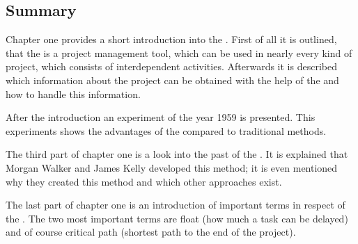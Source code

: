 \subsection{Summary}
Chapter one provides a short introduction into the \cpm{}. First of all it is
outlined, that the \cpm{} is a project management tool, which can be used in nearly
every kind of project, which consists of interdependent activities. Afterwards it is described which
information about the project can be obtained with the help of the \cpm{} and how to
handle this information.  

After the introduction an experiment of the year 1959 is presented. This experiments shows the
advantages of the \cpm{} compared to traditional methods. 

The third part of chapter one is a look into the past of the \cpm{}. It is explained
that Morgan Walker and James Kelly developed this method; it is even mentioned why they created this
method and which other approaches exist.  

The last part of chapter one is an introduction of important terms in respect of the \cpm{}.
The two most important terms are float (how much a task can be delayed) and of course
critical path (shortest path to the end of the project)\cite{santiago}.
